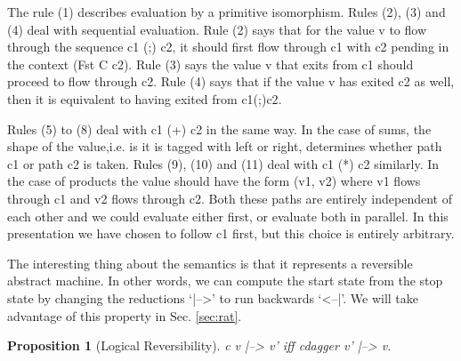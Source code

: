 \documentclass[preprint]{sigplanconf}
\newtheorem{proposition}[theorem]{Proposition}
\begin{document}
{%


The rule (1) describes evaluation by a primitive isomorphism. Rules
(2), (3) and (4) deal with sequential evaluation. Rule (2) says that
for the value {{v}} to flow through the sequence {{c1 (;) c2}}, it
should first flow through {{c1}} with {{c2}} pending in the context
({{Fst C c2}}). Rule (3) says the value {{v}} that exits from {{c1}}
should proceed to flow through {{c2}}. Rule (4) says that if the value
{{v}} has exited {{c2}} as well, then it is equivalent to having
exited from {{c1(;)c2}}.

Rules (5) to (8) deal with {{c1 (+) c2}} in the same way. In the case
of sums, the shape of the value,i.e. is it is tagged with {{left}} or
{{right}}, determines whether path {{c1}} or path {{c2}} is
taken. Rules (9), (10) and (11) deal with {{c1 (*) c2}} similarly. In
the case of products the value should have the form {{(v1, v2)}} where
{{v1}} flows through {{c1}} and {{v2}} flows through {{c2}}. Both
these paths are entirely independent of each other and we could
evaluate either first, or evaluate both in parallel. In this
presentation we have chosen to follow {{c1}} first, but this choice is
entirely arbitrary.

The interesting thing about the semantics is that it represents a
reversible abstract machine. In other words, we can compute the start
state from the stop state by changing the reductions `{{|-->}}' to run
backwards `{{<--|}}'. We will take advantage of this property in
Sec. \ref{sec:rat}.


\begin{proposition}[Logical Reversibility]
\label{prop:logrev}
{{c v |--> v'}} iff {{c{dagger} v' |--> v}}.
\end{proposition}

}
\end{document}
